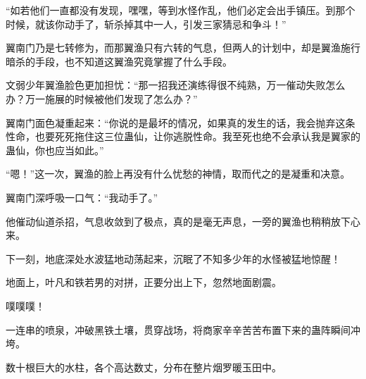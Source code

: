 \begin{this_body}
“如若他们一直都没有发现，嘿嘿，等到水怪作乱，他们必定会出手镇压。到那个时候，就该你动手了，斩杀掉其中一人，引发三家猜忌和争斗！”

翼南门乃是七转修为，而那翼渔只有六转的气息，但两人的计划中，却是翼渔施行暗杀的手段，也不知道这翼渔究竟掌握了什么手段。

文弱少年翼渔脸色更加担忧：“那一招我还演练得很不纯熟，万一催动失败怎么办？万一施展的时候被他们发现了怎么办？”

翼南门面色凝重起来：“你说的是最坏的情况，如果真的发生的话，我会抛弃这条性命，也要死死拖住这三位蛊仙，让你逃脱性命。我至死也绝不会承认我是翼家的蛊仙，你也应当如此。”

“嗯！”这一次，翼渔的脸上再没有什么忧愁的神情，取而代之的是凝重和决意。

翼南门深呼吸一口气：“我动手了。”

他催动仙道杀招，气息收敛到了极点，真的是毫无声息，一旁的翼渔也稍稍放下心来。

下一刻，地底深处水波猛地动荡起来，沉眠了不知多少年的水怪被猛地惊醒！

地面上，叶凡和铁若男的对拼，正要分出上下，忽然地面剧震。

噗噗噗！

一连串的喷泉，冲破黑铁土壤，贯穿战场，将商家辛辛苦苦布置下来的蛊阵瞬间冲垮。

数十根巨大的水柱，各个高达数丈，分布在整片烟罗暖玉田中。

\end{this_body}

